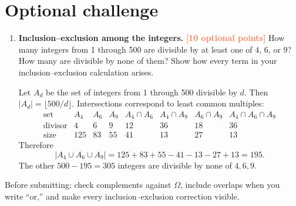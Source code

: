 \documentclass[11pt]{article}
\newcommand{\points}[1]{\hfill\textcolor{coral}{\small\bfseries[#1 points]}}
\begin{document}
\section*{Optional challenge}

\begin{enumerate}[resume]
\item \textbf{Inclusion--exclusion among the integers.} \points{10 optional}
How many integers from 1 through 500 are divisible by at least one of
$4$, $6$, or $9$? How many are divisible by none of them? Show how every
term in your inclusion--exclusion calculation arises.
\begin{solution}
Let $A_d$ be the set of integers from 1 through 500 divisible by $d$. Then
$|A_d|=\lfloor500/d\rfloor$. Intersections correspond to least common
multiples:
\[
\begin{array}{c|ccccccc}
\text{set}&A_4&A_6&A_9&A_4\cap A_6&A_4\cap A_9&A_6\cap A_9&A_4\cap A_6\cap A_9\\ \hline
\text{divisor}&4&6&9&12&36&18&36\\
\text{size}&125&83&55&41&13&27&13
\end{array}
\]
Therefore
\[
|A_4\cup A_6\cup A_9|
=125+83+55-41-13-27+13=195.
\]
The other $500-195=305$ integers are divisible by none of $4,6,9$.
\end{solution}
\end{enumerate}

\vfill
\begin{center}
\small\color{muted}
Before submitting: check complements against $\Omega$, include overlaps when
you write ``or,'' and make every inclusion--exclusion correction visible.
\end{center}
\end{document}
